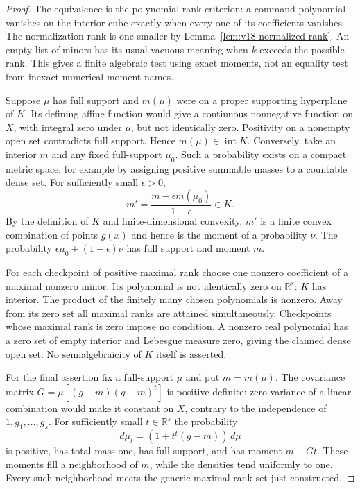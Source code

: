 \documentclass[11pt]{amsart}
\theoremstyle{definition}\newtheorem{definition}[theorem]{Definition}
\theoremstyle{remark}\newtheorem{remark}[theorem]{Remark}
\newcommand{\R}{\mathbb R}\newcommand{\N}{\mathbb N}\newcommand{\C}{\mathbb C}
\begin{document}
\begin{proof}
The equivalence is the polynomial rank criterion: a command polynomial
vanishes on the interior cube exactly when every one of its coefficients
vanishes. The normalization rank is one smaller by
Lemma~\ref{lem:v18-normalized-rank}. An empty list of minors has its
usual vacuous meaning when $k$ exceeds the possible rank. This gives a
finite algebraic test using exact moments, not an equality test from
inexact numerical moment names.

Suppose $\mu$ has full support and $m(\mu)$ were on a proper supporting
hyperplane of $K$. Its defining affine function would give a continuous
nonnegative function on $X$, with integral zero under $\mu$, but not
identically zero. Positivity on a nonempty open set contradicts full
support. Hence $m(\mu)\in\operatorname{int}K$. Conversely, take an
interior $m$ and any fixed full-support $\mu_0$. Such a probability
exists on a compact metric space, for example by assigning positive
summable masses to a countable dense set. For sufficiently small
$\epsilon>0$,
\[
 m'=\frac{m-\epsilon m(\mu_0)}{1-\epsilon}\in K.
\]
By the definition of $K$ and finite-dimensional convexity, $m'$ is a
finite convex combination of points $g(x)$ and hence is the moment of
a probability $\nu$. The probability
$\epsilon\mu_0+(1-\epsilon)\nu$ has full support and moment $m$.

For each checkpoint of positive maximal rank choose one nonzero
coefficient of a maximal nonzero minor. Its polynomial is not
identically zero on $\R^s$: $K$ has interior. The product of the
finitely many chosen polynomials is nonzero. Away from its zero set
all maximal ranks are attained simultaneously. Checkpoints whose
maximal rank is zero impose no condition. A nonzero real polynomial
has a zero set of empty interior and Lebesgue measure zero, giving the
claimed dense open set. No semialgebraicity of $K$ itself is asserted.

For the final assertion fix a full-support $\mu$ and put $m=m(\mu)$.
The covariance matrix $G=\mu[(g-m)(g-m)^t]$ is positive definite:
zero variance of a linear combination would make it constant on $X$,
contrary to the independence of $1,g_1,\ldots,g_s$. For sufficiently
small $t\in\R^s$ the probability
\[
 d\mu_t=(1+t^t(g-m))\,d\mu
\]
is positive, has total mass one, has full support, and has moment
$m+Gt$. These moments fill a neighborhood of $m$, while the densities
tend uniformly to one. Every such neighborhood meets the generic
maximal-rank set just constructed.
\end{proof}
\end{document}
